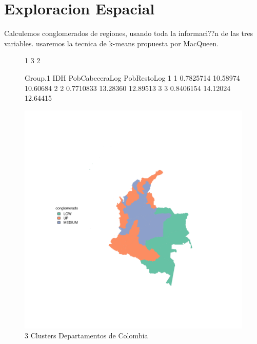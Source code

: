 \documentclass{article}
\begin{document}
\section{Exploracion Espacial}\label{espacial}
Calculemos conglomerados de regiones,
usando toda la informaci??n de las tres variables.
usaremos la tecnica de k-means propuesta por MacQueen.






\cite{macqueen_methods_nodate}

\begin{figure}[h]
\centering
\begin{Schunk}
\begin{Soutput}
[1] 1 3 2
\end{Soutput}
\begin{Soutput}
  Group.1       IDH PobCabeceraLog PobRestoLog
1       1 0.7825714       10.58974    10.60684
2       2 0.7710833       13.28360    12.89513
3       3 0.8406154       14.12024    12.64415
\end{Soutput}
\end{Schunk}
\includegraphics{ProyectoFInalLatex-plotMap}
\caption{3 Clusters Departamentos de Colombia}\label{clustmap}
\end{figure}


\renewcommand{\refname}{Bibliography}

\end{document}
